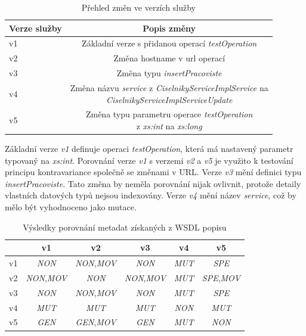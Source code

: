 \documentclass[czech,DP]{thesiskiv}
\begin{document}
\begin{table}[h]
	\centering
	\begin{tabular}{|l|c|}
		\hline
		Verze služby & Popis změny \\
		\hline
		\hline
		v1 & Základní verze s přidanou operací \textit{testOperation} \\
		\hline
		v2 & Změna hostname v url operací \\
		\hline
		v3 & Změna typu \textit{insertPracoviste} \\
		\hline
		v4 & \makecell{Změna názvu \textit{service} z \textit{CiselnikyServiceImplService} na \\ \textit{CiselnikyServiceImplServiceUpdate}}  \\
		\hline
		v5 & \makecell{Změna typu parametru operace \textit{testOperation} \\
		z \textit{xs:int} na \textit{xs:long}} \\ \hline
	\end{tabular}
	\caption{Přehled změn ve verzích služby}
	\label{tab:wsdl-diffs}
\end{table}

Základní verze \textit{v1} definuje operaci \textit{testOperation}, která má nastavený parametr typovaný na \textit{xs:int}. Porovnání verze \textit{v1} s verzemi \textit{v2} a \textit{v5} je využito k testování principu kontravariance společně se změnami v URL. Verze \textit{v3} mění definici typu \textit{insertPracoviste}. Tato změna by neměla porovnání nijak ovlivnit, protože detaily vlastních datových typů nejsou indexovány. Verze \textit{v4} mění název \textit{service}, což by mělo být vyhodnoceno jako mutace.

\begin{table}[h]
	\centering
	\begin{tabular}{|l||c|c|c|c|c|}
		\hline
		& v1 & v2 & v3 & v4 & v5 \\
		\hline
		\hline
		v1 & \textit{NON} & \textit{NON},\textit{MOV} & \textit{NON} & \textit{MUT} & \textit{SPE} \\
		\hline
		v2 & \textit{NON},\textit{MOV} & \textit{NON} & \textit{NON},\textit{MOV} & \textit{MUT} & \textit{SPE},\textit{MOV} \\
		\hline
		v3 & \textit{NON} & \textit{NON},\textit{MOV} & \textit{NON} & \textit{MUT} & \textit{SPE} \\
		\hline
		v4 & \textit{MUT} & \textit{MUT} & \textit{MUT} & \textit{NON} & \textit{MUT} \\
		\hline
		v5 & \textit{GEN} & \textit{GEN},\textit{MOV} & \textit{GEN} & \textit{MUT} & \textit{NON} \\
		\hline
	\end{tabular}
	\caption{Výsledky porovnání metadat získaných z WSDL popisu}
	\label{tab:stag-wsdl-cmp-res}
\end{table}
\end{document}
